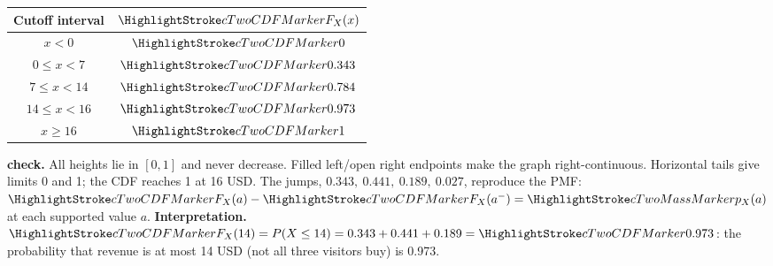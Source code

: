   \begin{minipage}[t]{.37\linewidth}%
    \vspace{0pt}\centering
    \begin{tabular}{cc}%
      \toprule
      Cutoff interval & $\cTwoCDFHL{F_X(x)}$ \\ \midrule
      $x<0$ & $\cTwoCDFHL{0}$ \\
      $0\leq x<7$ & $\cTwoCDFHL{0.343}$ \\
      $7\leq x<14$ & $\cTwoCDFHL{0.784}$ \\
      $14\leq x<16$ & $\cTwoCDFHL{0.973}$ \\
      $x\geq 16$ & $\cTwoCDFHL{1}$ \\
      \bottomrule%
    \end{tabular}
  \end{minipage}%
  \hfill%
  \begin{minipage}[t]{.60\linewidth}%
    \vspace{0pt}\centering
  \end{minipage}%
  \par
  \textbf{ check.} All heights lie in $[0,1]$ and never decrease. Filled left/open right endpoints make the
  graph right-continuous. Horizontal tails give limits 0 and 1; the CDF reaches 1 at 16 USD. The jumps, $0.343,\
    0.441,\ 0.189,\ 0.027$, reproduce the PMF: $\cTwoCDFHL{F_X(a)}-\cTwoCDFHL{F_X(a^-)}=\cTwoMassHL{p_X(a)}$ at each supported value $a$.
  \textbf{Interpretation.} $\cTwoCDFHL{F_X(14)}=P(X\leq14)=0.343+0.441+0.189=\cTwoCDFHL{0.973}$: the probability that revenue is at most 14 USD (not all three
  visitors buy) is 0.973.
